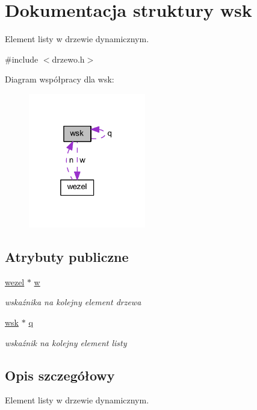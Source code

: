 \hypertarget{structwsk}{}\section{Dokumentacja struktury wsk}
\label{structwsk}


Element listy w drzewie dynamicznym.  




{\ttfamily \#include $<$drzewo.\+h$>$}



Diagram współpracy dla wsk\+:\nopagebreak
\begin{figure}[H]
\begin{center}
\leavevmode
\includegraphics[width=145pt]{structwsk__coll__graph}
\end{center}
\end{figure}
\subsection*{Atrybuty publiczne}
\begin{DoxyCompactItemize}
\item 
\hyperlink{structwezel}{wezel} $\ast$ \hyperlink{structwsk_a69da68a1f76055e88538302c86ec7ac6}{w}
\begin{DoxyCompactList}\small\item\em wskaźnika na kolejny element drzewa \end{DoxyCompactList}\item 
\hyperlink{structwsk}{wsk} $\ast$ \hyperlink{structwsk_a5957f1d185b541d7572b8d9a11a8bf7d}{q}
\begin{DoxyCompactList}\small\item\em wskaźnik na kolejny element listy \end{DoxyCompactList}\end{DoxyCompactItemize}


\subsection{Opis szczegółowy}
Element listy w drzewie dynamicznym. 

